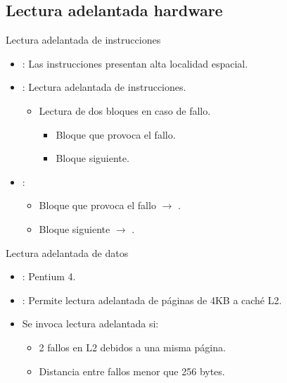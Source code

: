 \subsection{Lectura adelantada hardware}

\begin{frame}[t]{Lectura adelantada de instrucciones}
\begin{itemize}
  \item {}: Las instrucciones presentan 
        alta localidad espacial.

  \item {}: Lectura adelantada
        de instrucciones.
    \begin{itemize}
      \item Lectura de dos bloques en caso de fallo.
        \begin{itemize}
          \item Bloque que provoca el fallo.
          \item Bloque siguiente.
        \end{itemize}
    \end{itemize}

  \item {}:
    \begin{itemize}
      \item Bloque que provoca el fallo $\rightarrow$ .
      \item Bloque siguiente $\rightarrow$ .
    \end{itemize}
\end{itemize}
\end{frame}

\begin{frame}[t]{Lectura adelantada de datos}
\begin{itemize}
  \item {}: Pentium 4.

  \item {}: Permite lectura adelantada de páginas de 4KB a caché L2.

  \item Se invoca lectura adelantada si:
    \begin{itemize}
      \item 2 fallos en L2 debidos a una misma página.
      \item Distancia entre fallos menor que 256 bytes.
    \end{itemize}

\end{itemize}
\end{frame}
